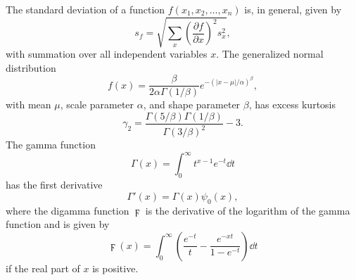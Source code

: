 The standard deviation of a function $f(x_{1},x_{2},\dots,x_{n})$ is, in general, given by
\begin{equation} \label{eq:analysis--general_stdev}
	s_{f} = \sqrt{\sum_{x} \left( \frac{\partial f}{\partial x} \right)^{2} s_{x}^{2}},
\end{equation}
with summation over all independent variables $x$.  The generalized normal distribution
\begin{equation} \label{eq:analysis--generalized_normal_reprint}
	f(x) = \frac{\beta}{2 \alpha \Gamma(1/\beta)} e^{-(|x - \mu| / \alpha)^{\beta}},
\end{equation}
with mean $\mu$, scale parameter $\alpha$, and shape parameter $\beta$, has excess kurtosis
\begin{equation} \label{eq:analysis--kurtosis_reprint}
	\gamma_{2} = \frac{\Gamma(5/\beta) \Gamma(1/\beta)}{\Gamma(3/\beta)^{2}} - 3.
\end{equation}
The gamma function
\begin{equation} \label{eq:analysis--gamma_function_reprint}
	\Gamma(x) = \int_{0}^{\infty} t^{x-1} e^{-t} \dd t
\end{equation}
has the first derivative
\begin{equation} \label{eq:analysis--gamma_prime}
	\Gamma'(x) = \Gamma(x) \psi_{0}(x),
\end{equation}
where the digamma function $\digamma$ is the derivative of the logarithm of the gamma function and is given by
\begin{equation} \label{eq:analysis--digamma}
	\digamma(x) = \int_{0}^{\infty} \left( \frac{e^{-t}}{t} - \frac{e^{-xt}}{1 - e^{-t}} \right) \dd t
\end{equation}
if the real part of $x$ is positive.

